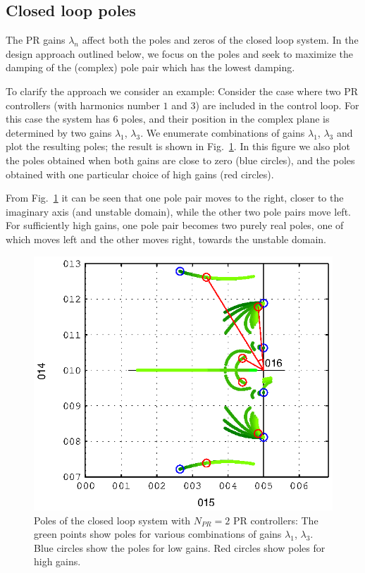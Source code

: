 \documentclass[conference,10pt]{IEEEtran}
\begin{document}
\subsection{Closed loop poles}
The PR gains $\lambda_n$ affect both the poles and zeros of the closed loop system. In the design approach outlined below, we focus on the poles and seek to maximize the damping of the (complex) pole pair which has the lowest damping.

To clarify the approach we consider an example: Consider the case where two PR controllers (with harmonics number $1$ and $3$) are included in the control loop. For this case the system has $6$ poles, and their position in the complex plane is determined by  two gains $\lambda_1$, $\lambda_3$.
We enumerate combinations of gains $\lambda_1$, $\lambda_3$ and plot the resulting poles; the result is shown in Fig.~\ref{fig:PoleExample}. In this figure we also plot the poles obtained when both gains are close to zero (blue circles), and the poles obtained with one particular choice of high gains (red circles). 

From Fig.~\ref{fig:PoleExample} it can be seen that one pole pair moves to the right, closer to the imaginary axis (and unstable domain), while the other two pole pairs move left. For sufficiently high gains, one pole pair becomes two purely real poles, one of which moves left and the other moves right, towards the unstable domain.
\begin{figure}[!h]
\centering

\includegraphics{fig/root_locus_2D}
\caption{Poles of the closed loop system with $N_{PR}=2$ PR controllers: The green points show poles for various combinations of gains $\lambda_1$,
$\lambda_3$. Blue circles show the poles for low gains. Red circles show poles for high gains. }
\label{fig:PoleExample}
\end{figure}
\end{document}
